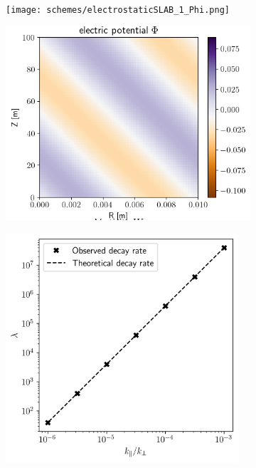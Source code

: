 \begin{figure}[H]
	\centering
	\begin{subfigure}[b]{0.34\textwidth}
		\centering
		\texttt{[image: schemes/electrostaticSLAB\_1\_Phi.png]}
		\label{fig:electrostaticSLAB_initialProfile_PHI}
	\end{subfigure}
	\begin{subfigure}[b]{0.34\textwidth}
		\centering
		\includegraphics[width=1.\textwidth]{schemes/electrostaticSLAB_35_Phi.png}
		\label{fig:electrostaticSLAB_endProfile_PHI}
	\end{subfigure}
	\begin{subfigure}[b]{0.30\textwidth}
		\centering
		\includegraphics[width=0.95\textwidth]{schemes/Electrostatic_analysis_different_k_para_k_perp.png}

\end{subfigure}
\end{figure}
